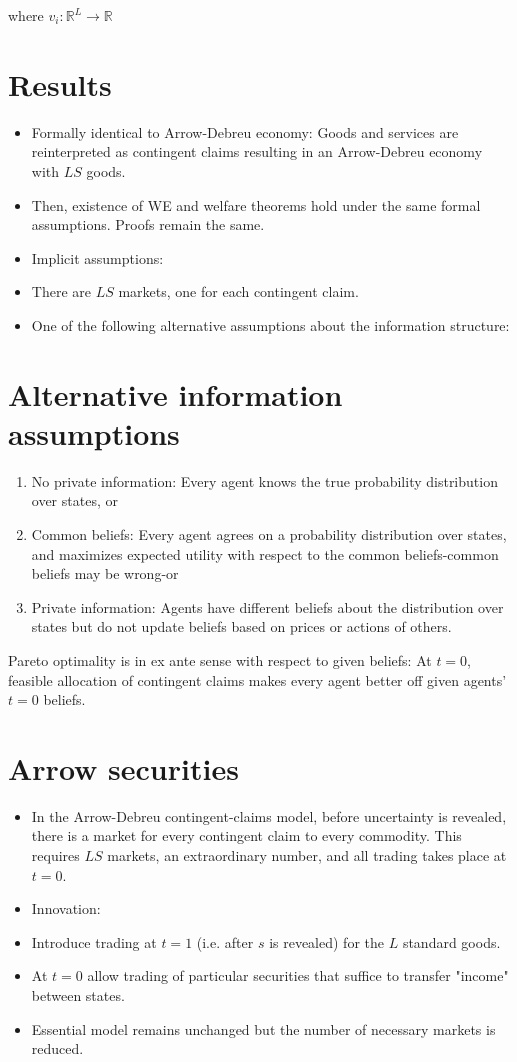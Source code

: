 \documentclass[10pt]{article}
\begin{document}
where $v_{i}: \mathbb{R}^{L} \rightarrow \mathbb{R}$

\section*{Results}
\begin{itemize}
  \item Formally identical to Arrow-Debreu economy: Goods and services are reinterpreted as contingent claims resulting in an Arrow-Debreu economy with $L S$ goods.
  \item Then, existence of WE and welfare theorems hold under the same formal assumptions. Proofs remain the same.
  \item Implicit assumptions:
  \item There are $L S$ markets, one for each contingent claim.
  \item One of the following alternative assumptions about the information structure:
\end{itemize}

\section*{Alternative information assumptions}
\begin{enumerate}
  \item No private information: Every agent knows the true probability distribution over states, or
  \item Common beliefs: Every agent agrees on a probability distribution over states, and maximizes expected utility with respect to the common beliefs-common beliefs may be wrong-or
  \item Private information: Agents have different beliefs about the distribution over states but do not update beliefs based on prices or actions of others.
\end{enumerate}

Pareto optimality is in ex ante sense with respect to given beliefs: At $t=0$, feasible allocation of contingent claims makes every agent better off given agents' $t=0$ beliefs.

\section*{Arrow securities}
\begin{itemize}
  \item In the Arrow-Debreu contingent-claims model, before uncertainty is revealed, there is a market for every contingent claim to every commodity. This requires $L S$ markets, an extraordinary number, and all trading takes place at $t=0$.
  \item Innovation:
  \item Introduce trading at $t=1$ (i.e. after $s$ is revealed) for the $L$ standard goods.
  \item At $t=0$ allow trading of particular securities that suffice to transfer "income" between states.
  \item Essential model remains unchanged but the number of necessary markets is reduced.
\end{itemize}
\end{document}
